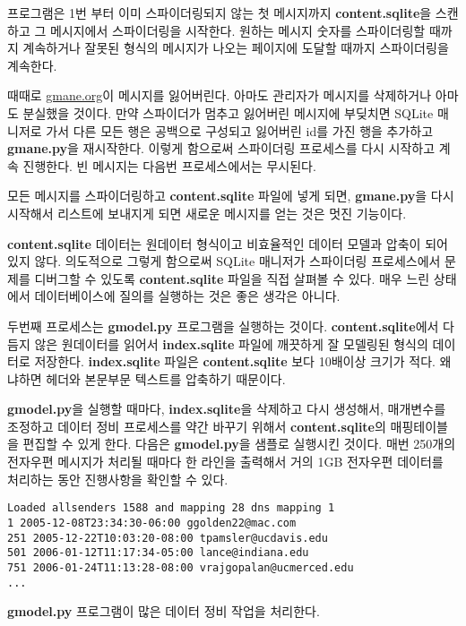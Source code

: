 프로그램은 1번 부터 이미 스파이더링되지 않는 첫 메시지까지 {\bf content.sqlite}을 스캔하고
그 메시지에서 스파이더링을 시작한다. 원하는 메시지 숫자를 스파이더링할 때까지 
계속하거나 잘못된 형식의 메시지가 나오는 페이지에 도달할 때까지 스파이더링을 계속한다.

때때로 \url{gmane.org}이 메시지를 잃어버린다. 아마도 관리자가 메시지를 삭제하거나
아마도 분실했을 것이다. 만약 스파이더가 멈추고 잃어버린 메시지에 부딪치면 
SQLite 매니저로 가서 다른 모든 행은 공백으로 구성되고 잃어버린 id를 가진 행을 추가하고 
{\bf gmane.py}을 재시작한다. 이렇게 함으로써 스파이더링 프로세스를 다시 시작하고 계속 진행한다.
빈 메시지는 다음번 프로세스에서는 무시된다.

모든 메시지를 스파이더링하고 {\bf content.sqlite} 파일에 넣게 되면, 
{\bf gmane.py}을 다시 시작해서 리스트에 보내지게 되면 새로운 메시지를 얻는 것은 멋진 기능이다.

{\bf content.sqlite} 데이터는 원데이터 형식이고 비효율적인 데이터 모델과 압축이 되어 있지 않다.
의도적으로 그렇게 함으로써 SQLite 매니저가 스파이더링 프로세스에서 문제를 디버그할 수 있도록
{\bf content.sqlite} 파일을 직접 살펴볼 수 있다. 매우 느린 상태에서 데이터베이스에 질의를 실행하는 것은 
좋은 생각은 아니다.

두번째 프로세스는 {\bf gmodel.py} 프로그램을 실행하는 것이다. 
{\bf content.sqlite}에서 다듬지 않은 원데이터를 읽어서 {\bf index.sqlite} 파일에 
깨끗하게 잘 모델링된 형식의 데이터로 저장한다.
{\bf index.sqlite} 파일은 {\bf content.sqlite} 보다 10배이상 크기가 적다. 왜냐하면 헤더와 본문부문 텍스트를 
압축하기 때문이다.

{\bf gmodel.py}을 실행할 때마다, {\bf index.sqlite}을 삭제하고 다시 생성해서, 매개변수를 조정하고
데이터 정비 프로세스를 약간 바꾸기 위해서 {\bf content.sqlite}의 매핑테이블을 편집할 수 있게 한다.
다음은 {\bf gmodel.py}을 샘플로 실행시킨 것이다. 매번 250개의 전자우편 메시지가 처리될 때마다 한 라인을 
출력해서 거의 1GB 전자우편 데이터를 처리하는 동안 진행사항을 확인할 수 있다.

\beforeverb
\begin{verbatim}
Loaded allsenders 1588 and mapping 28 dns mapping 1
1 2005-12-08T23:34:30-06:00 ggolden22@mac.com
251 2005-12-22T10:03:20-08:00 tpamsler@ucdavis.edu
501 2006-01-12T11:17:34-05:00 lance@indiana.edu
751 2006-01-24T11:13:28-08:00 vrajgopalan@ucmerced.edu
...
\end{verbatim}
\afterverb
%

{\bf gmodel.py} 프로그램이 많은 데이터 정비 작업을 처리한다.


